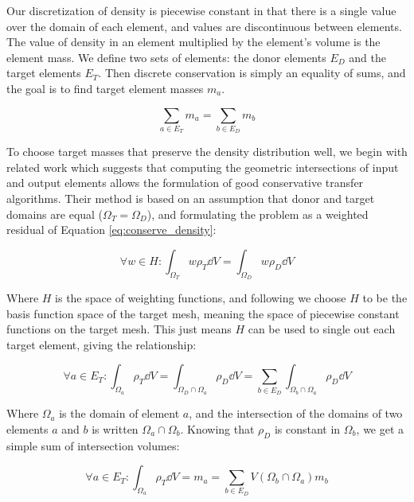 Our discretization of density is piecewise constant in that there is
a single value over the domain of each element,
and values are discontinuous between elements.
The value of density in an element multiplied by the element's
volume is the element mass.
We define two sets of elements: the donor elements $E_D$ and
the target elements $E_T$.
Then discrete conservation is simply an equality of sums,
and the goal is to find target element masses $m_a$.

\begin{equation}
\sum_{a \in E_T} m_a = \sum_{b \in E_D} m_b
\end{equation}

To choose target masses that preserve the density distribution well,
we begin with related work
\cite{jiao2004common,farrell2009conservative} which suggests that
computing the geometric intersections of input and output elements
allows the formulation of good conservative transfer algorithms.
Their method is based on an assumption that donor and target domains
are equal ($\Omega_T=\Omega_D$), and formulating the problem as a
weighted residual of Equation \ref{eq:conserve_density}:

\begin{equation} \label{eq:weighted_residual}
\forall w \in H: \int_{\Omega_T} w \rho_T \dd V = \int_{\Omega_D} w \rho_D \dd V
\end{equation}

Where $H$ is the space of weighting functions, and following
\cite{jiao2004common} we choose $H$ to be the basis function space of the target mesh,
meaning the space of piecewise constant functions on the target mesh.
This just means $H$ can be used to single out each target element,
giving the relationship:

\begin{equation}
\forall a \in E_T: \int_{\Omega_a} \rho_T \dd V
= \int_{\Omega_D \cap \Omega_a} \rho_D \dd V
= \sum_{b \in E_D} \int_{\Omega_b \cap \Omega_a} \rho_D \dd V
\end{equation}

Where $\Omega_a$ is the domain of element $a$, and the intersection of the
domains of two elements $a$ and $b$ is written $\Omega_a \cap \Omega_b$.
Knowing that $\rho_D$ is constant in $\Omega_b$, we get a simple
sum of intersection volumes:

\begin{equation} \label{eq:same_domain_mass}
\forall a \in E_T: \int_{\Omega_a} \rho_T \dd V = m_a
= \sum_{b \in E_D} V(\Omega_b \cap \Omega_a) m_b
\end{equation}

